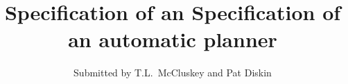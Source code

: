 \documentclass{article}
\begin{document}
\title{Specification of an Specification of an automatic planner}
\author{Submitted by T.L.\ McCluskey and Pat Diskin}
\maketitle



\printindex
\end{document}
